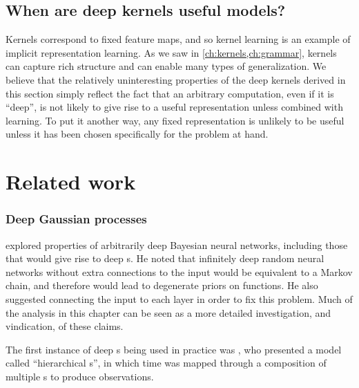 \subsection{When are deep kernels useful models?}

Kernels correspond to fixed feature maps, and so kernel learning is an example of implicit representation learning. %
As we saw in \cref{ch:kernels,ch:grammar}, kernels can capture rich structure and can enable many types of generalization.
We believe that the relatively uninteresting properties of the deep kernels derived in this section simply reflect the fact that an arbitrary computation, even if it is ``deep'', is not likely to give rise to a useful representation unless combined with learning.
To put it another way, any fixed representation is unlikely to be useful unless it has been chosen specifically for the problem at hand.






\section{Related work}

\subsubsection{Deep Gaussian processes}
\citet[chapter 2]{neal1995bayesian} explored properties of arbitrarily deep Bayesian neural networks, including those that would give rise to deep \gp{}s.
He noted that infinitely deep random neural networks without extra connections to the input would be equivalent to a Markov chain, and therefore would lead to degenerate priors on functions.
He also suggested connecting the input to each layer in order to fix this problem.
Much of the analysis in this chapter can be seen as a more detailed investigation, and vindication, of these claims.

The first instance of deep \gp{}s being used in practice was \citep{lawrence2007hierarchical}, who presented a model called ``hierarchical \gplvm{}s'', in which time was mapped through a composition of multiple \gp{}s to produce observations.

